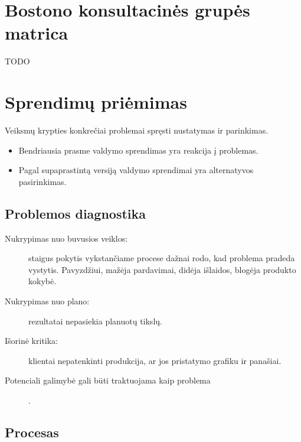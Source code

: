 \section{Bostono konsultacinės grupės matrica}

TODO

\section{Sprendimų priėmimas}

\begin{defn}
  Veiksmų krypties konkrečiai problemai spręsti nustatymas ir parinkimas.
  \begin{itemize}
    \item Bendriausia prasme valdymo sprendimas yra reakcija į problemas.
    \item Pagal supaprastintą versiją valdymo sprendimai yra alternatyvos
      pasirinkimas.
  \end{itemize}
\end{defn}

\subsection{Problemos diagnostika}

\begin{description}
  \item[Nukrypimas nuo buvusios veiklos:] staigus pokytis
    vykstančiame procese dažnai rodo, kad problema pradeda vystytis.
    Pavyzdžiui, mažėja pardavimai, didėja išlaidos, blogėja produkto
    kokybė.
  \item[Nukrypimas nuo plano:] rezultatai nepasiekia planuotų
    tikslų.
  \item[Išorinė kritika:] klientai nepatenkinti produkcija, ar jos
    pristatymo grafiku ir panašiai.
  \item[Potenciali galimybė gali būti traktuojama kaip problema] .
\end{description}

\subsection{Procesas}

